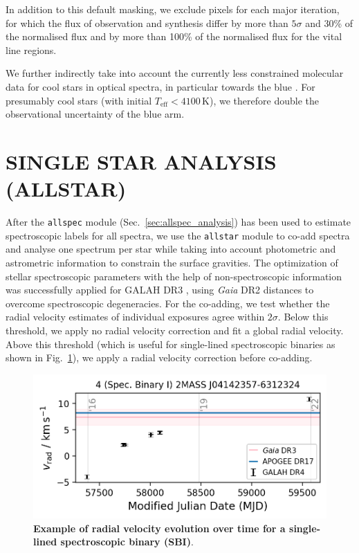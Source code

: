 \documentclass[
  journal=pasa,
  manuscript=research-paper, %
  year=2024,
  volume=37
]{cup-journal}
\newcommand{\Gaia}{\textit{Gaia}\xspace}
\begin{document}
In addition to this default masking, we exclude pixels for each major iteration, for which the flux of observation and synthesis differ by more than $5 \sigma$ and 30\% of the normalised flux and by more than 100\% of the normalised flux for the vital line regions.

We further indirectly take into account the currently less constrained molecular data for cool stars in optical spectra, in particular towards the blue \citep[e.g.][]{Rains2021}. For presumably cool stars (with initial $T_\text{eff} < 4100\,\mathrm{K}$), we therefore double the observational uncertainty of the blue arm.

\section{SINGLE STAR ANALYSIS (ALLSTAR)}
\label{sec:allstar_analysis}

After the \texttt{allspec} module (Sec.~\ref{sec:allspec_analysis}) has been used to estimate spectroscopic labels for all spectra, we use the \texttt{allstar} module to co-add spectra and analyse one spectrum per star while taking into account photometric and astrometric information to constrain the surface gravities. The optimization of stellar spectroscopic parameters with the help of non-spectroscopic information was successfully applied for GALAH DR3 \citep{Buder2021}, using \Gaia DR2 distances \citep{BailerJones2018} to overcome spectroscopic degeneracies. For the co-adding, we test whether the radial velocity estimates of individual exposures agree within $2\sigma$. Below this threshold, we apply no radial velocity correction and fit a global radial velocity. Above this threshold (which is useful for single-lined spectroscopic binaries as shown in Fig.~\ref{fig:examples_flag_sp_2}), we apply a radial velocity correction before co-adding.

\begin{figure}[ht]
 \centering
 \includegraphics[width=\textwidth]{figures/examples_flag_sp_2.png}
 \caption{\textbf{Example of radial velocity evolution over time for a single-lined spectroscopic binary (SBI)}.}
 \label{fig:examples_flag_sp_2}
\end{figure}
\end{document}
